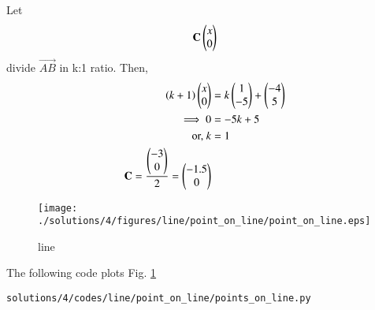 Let
\begin{align}
\mathbf{C}\begin{pmatrix}x\\0\end{pmatrix}
\end{align}
divide  $\vec{AB} $ in k:1 ratio.
Then, 
\begin{align}
\left(k+1\right)\begin{pmatrix}x\\0\end{pmatrix} &=k\begin{pmatrix}1\\-5\end{pmatrix} + \begin{pmatrix}-4\\5\end{pmatrix}
\\
\implies 0 &= -5k + 5
\\
\text{or, }k&= 1
\\
\mathbf{C} = \frac{\begin{pmatrix}-3\\0\end{pmatrix}}{2} = \begin{pmatrix}-1.5\\0\end{pmatrix}
\end{align}
\begin{figure}[!ht]
	\centering
	\texttt{[image: ./solutions/4/figures/line/point\_on\_line/point\_on\_line.eps]}
	\caption{line }
	\label{fig:3.6.4_line}
\end{figure}

The following code plots Fig. 	\ref{fig:3.6.4_line}

\begin{lstlisting}
solutions/4/codes/line/point_on_line/points_on_line.py
\end{lstlisting}

